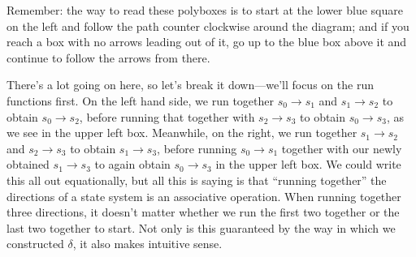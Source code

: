 \documentclass[Book-Poly]{subfiles}
\begin{document}
Remember: the way to read these polyboxes is to start at the lower blue square on the left and follow the path counter clockwise around the diagram; and if you reach a box with no arrows leading out of it, go up to the blue box above it and continue to follow the arrows from there.

There's a lot going on here, so let's break it down---we'll focus on the run functions first.
On the left hand side, we run together $s_0\to s_1$ and $s_1\to s_2$ to obtain $s_0\to s_2$, before running that together with $s_2\to s_3$ to obtain $s_0\to s_3$, as we see in the upper left box.
Meanwhile, on the right, we run together $s_1\to s_2$ and $s_2\to s_3$ to obtain $s_1\to s_3$, before running $s_0\to s_1$ together with our newly obtained $s_1\to s_3$ to again obtain $s_0\to s_3$ in the upper left box.
We could write this all out equationally, but all this is saying is that ``running together'' the directions of a state system is an associative operation.
When running together three directions, it doesn't matter whether we run the first two together or the last two together to start.
Not only is this guaranteed by the way in which we constructed $\delta$, it also makes intuitive sense.
\end{document}
